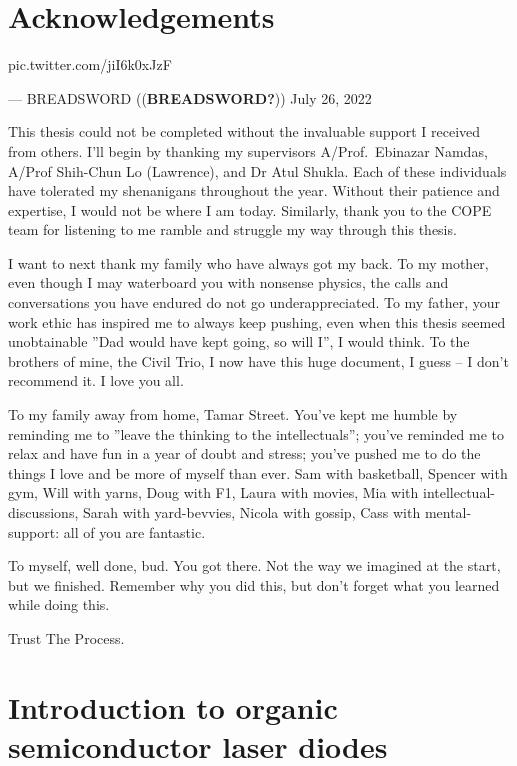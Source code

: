 \documentclass[
  letterpaper,
  DIV=11,
  numbers=noendperiod,
  oneside]{scrreprt}
\begin{document}

\hypertarget{acknowledgements}{%
\chapter*{Acknowledgements}\label{acknowledgements}}


pic.twitter.com/jiI6k0xJzF

--- BREADSWORD ((\textbf{BREADSWORD?})) July 26, 2022

This thesis could not be completed without the invaluable support I
received from others. I'll begin by thanking my supervisors
A/Prof.~Ebinazar Namdas, A/Prof Shih-Chun Lo (Lawrence), and Dr Atul
Shukla. Each of these individuals have tolerated my shenanigans
throughout the year. Without their patience and expertise, I would not
be where I am today. Similarly, thank you to the COPE team for listening
to me ramble and struggle my way through this thesis.

I want to next thank my family who have always got my back. To my
mother, even though I may waterboard you with nonsense physics, the
calls and conversations you have endured do not go underappreciated. To
my father, your work ethic has inspired me to always keep pushing, even
when this thesis seemed unobtainable ''Dad would have kept going, so
will I'', I would think. To the brothers of mine, the Civil Trio, I now
have this huge document, I guess -- I don't recommend it. I love you
all.

To my family away from home, Tamar Street. You've kept me humble by
reminding me to ''leave the thinking to the intellectuals''; you've
reminded me to relax and have fun in a year of doubt and stress; you've
pushed me to do the things I love and be more of myself than ever. Sam
with basketball, Spencer with gym, Will with yarns, Doug with F1, Laura
with movies, Mia with intellectual-discussions, Sarah with yard-bevvies,
Nicola with gossip, Cass with mental-support: all of you are fantastic.

To myself, well done, bud. You got there. Not the way we imagined at the
start, but we finished. Remember why you did this, but don't forget what
you learned while doing this.

Trust The Process.


\hypertarget{introduction-to-organic-semiconductor-laser-diodes}{%
\chapter[Introduction to organic semiconductor laser
diodes]{\texorpdfstring{\protect\hypertarget{sec:level1}{}{}Introduction
to organic semiconductor laser
diodes}{Introduction to organic semiconductor laser diodes}}\label{introduction-to-organic-semiconductor-laser-diodes}}
\end{document}
